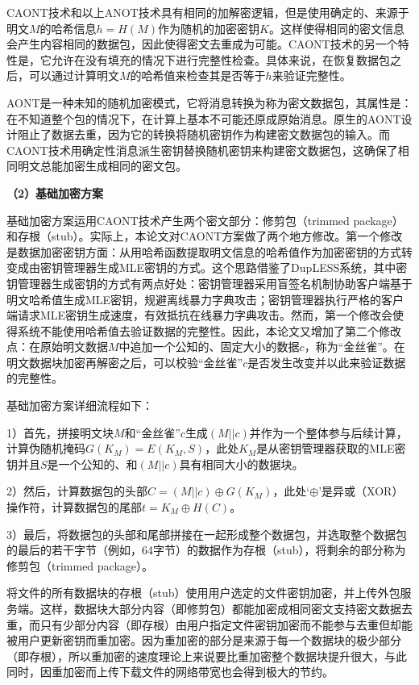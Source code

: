 \documentclass[promaster]{thesis-uestc}
\begin{document}
CAONT技术和以上ANOT技术具有相同的加解密逻辑，但是使用确定的、来源于明文$M$的哈希信息$h = H(M)$作为随机的加密密钥$K$。这样使得相同的密文信息会产生内容相同的数据包，因此使得密文去重成为可能。CAONT技术的另一个特性是，它允许在没有填充的情况下进行完整性检查。具体来说，在恢复数据包之后，可以通过计算明文$M$的哈希值来检查其是否等于$h$来验证完整性。

AONT是一种未知的随机加密模式，它将消息转换为称为密文数据包，其属性是：在不知道整个包的情况下，在计算上基本不可能还原成原始消息。原生的AONT设计阻止了数据去重，因为它的转换将随机密钥作为构建密文数据包的输入。而CAONT技术用确定性消息派生密钥替换随机密钥来构建密文数据包，这确保了相同明文总能加密生成相同的密文包。

\textbf{（2）基础加密方案}\label{caont-basic}

基础加密方案运用CAONT技术产生两个密文部分：修剪包（trimmed package）和存根（stub）。实际上，本论文对CAONT方案做了两个地方修改。第一个修改是数据加密密钥方面：从用哈希函数提取明文信息的哈希值作为加密密钥的方式转变成由密钥管理器生成MLE密钥的方式。这个思路借鉴了DupLESS系统，其中密钥管理器生成密钥的方式有两点好处：密钥管理器采用盲签名机制协助客户端基于明文哈希值生成MLE密钥，规避离线暴力字典攻击；密钥管理器执行严格的客户端请求MLE密钥生成速度，有效抵抗在线暴力字典攻击。然而，第一个修改会使得系统不能使用哈希值去验证数据的完整性。因此，本论文又增加了第二个修改点：在原始明文数据$M$中追加一个公知的、固定大小的数据$c$，称为“金丝雀”。在明文数据块加密再解密之后，可以校验“金丝雀”$c$是否发生改变并以此来验证数据的完整性。

基础加密方案详细流程如下：

1）首先，拼接明文块$M$和“金丝雀”$c$生成$(M||c)$并作为一个整体参与后续计算，计算伪随机掩码$G(K_M) = E(K_M, S)$，此处$K_M$是从密钥管理器获取的MLE密钥并且$S$是一个公知的、和$(M||c)$具有相同大小的数据块。

2）然后，计算数据包的头部$C = (M||c) \oplus G(K_M)$，此处‘$\oplus$’是异或（XOR）操作符，计算数据包的尾部$t = K_M \oplus H(C)$。

3）最后，将数据包的头部和尾部拼接在一起形成整个数据包，并选取整个数据包的最后的若干字节（例如，64字节）的数据作为存根（stub），将剩余的部分称为修剪包（trimmed package）。

将文件的所有数据块的存根（stub）使用用户选定的文件密钥加密，并上传外包服务端。这样，数据块大部分内容（即修剪包）都能加密成相同密文支持密文数据去重，而只有少部分内容（即存根）由用户指定文件密钥加密而不能参与去重但却能被用户更新密钥而重加密。因为重加密的部分是来源于每一个数据块的极少部分（即存根），所以重加密的速度理论上来说要比重加密整个数据块提升很大，与此同时，因重加密而上传下载文件的网络带宽也会得到极大的节约。
\end{document}
